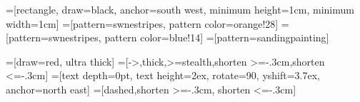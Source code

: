  {
	\pgfpoint{0cm}{0cm}
}{
	\pgfpoint{2cm}{2cm}
}{
	\pgfpoint{1cm}{1cm}
}{
		\pgfsetlinewidth{10pt}
		\pgfpathmoveto{\pgfpoint{0cm}{0cm}}
		\pgfpathlineto{\pgfpoint{2cm}{2cm}}
}

 {
	\pgfpoint{0cm}{0cm}
}{
	\pgfpoint{4cm}{4cm}
}{
	\pgfpoint{2cm}{2cm}
}{
		\pgfsetlinewidth{10pt}
		\pgfpathmoveto{\pgfpoint{0cm}{0cm}}
		\pgfpathlineto{\pgfpoint{10cm}{10cm}}
		\pgfpathclose%
		\pgfpathmoveto{\pgfpoint{1cm}{0cm}}
		\pgfpathlineto{\pgfpoint{11cm}{10cm}}
		\pgfpathclose%
}

=[rectangle, draw=black, anchor=south west, minimum height=1cm, minimum width=1cm]
=[pattern=swnestripes, pattern color=orange!28]
=[pattern=swnestripes, pattern color=blue!14]
=[pattern=sandingpainting]

=[draw=red, ultra thick]
=[->,thick,>=stealth,shorten >=-.3cm,shorten <=-.3cm]
=[text depth=0pt, text height=2ex, rotate=90, yshift=3.7ex, anchor=north east]
=[dashed,shorten >=-.3cm, shorten <=-.3cm]